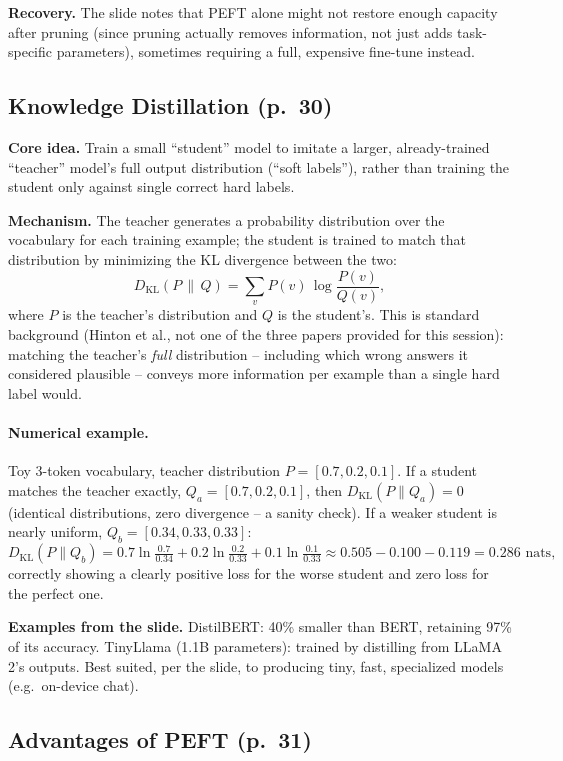 \documentclass[11pt]{article}
\begin{document}
\textbf{Recovery.} The slide notes that PEFT alone might not restore enough capacity after pruning (since pruning actually removes information, not just adds task-specific parameters), sometimes requiring a full, expensive fine-tune instead.

\subsection{Knowledge Distillation (p.\ 30)}

\textbf{Core idea.} Train a small ``student'' model to imitate a larger, already-trained ``teacher'' model's full output distribution (``soft labels''), rather than training the student only against single correct hard labels.

\textbf{Mechanism.} The teacher generates a probability distribution over the vocabulary for each training example; the student is trained to match that distribution by minimizing the KL divergence between the two:
\[
D_{\mathrm{KL}}(P\,\|\,Q) = \sum_{v} P(v)\,\log\frac{P(v)}{Q(v)},
\]
where $P$ is the teacher's distribution and $Q$ is the student's. This is standard background (Hinton et al., not one of the three papers provided for this session): matching the teacher's \emph{full} distribution -- including which wrong answers it considered plausible -- conveys more information per example than a single hard label would.

\paragraph{Numerical example.} Toy 3-token vocabulary, teacher distribution $P=[0.7,0.2,0.1]$. If a student matches the teacher exactly, $Q_a=[0.7,0.2,0.1]$, then $D_{\mathrm{KL}}(P\|Q_a)=0$ (identical distributions, zero divergence -- a sanity check). If a weaker student is nearly uniform, $Q_b=[0.34,0.33,0.33]$:
\[
D_{\mathrm{KL}}(P\|Q_b) = 0.7\ln\tfrac{0.7}{0.34} + 0.2\ln\tfrac{0.2}{0.33} + 0.1\ln\tfrac{0.1}{0.33} \approx 0.505 - 0.100 - 0.119 = 0.286\text{ nats},
\]
correctly showing a clearly positive loss for the worse student and zero loss for the perfect one.

\textbf{Examples from the slide.} DistilBERT: 40\% smaller than BERT, retaining 97\% of its accuracy. TinyLlama (1.1B parameters): trained by distilling from LLaMA 2's outputs. Best suited, per the slide, to producing tiny, fast, specialized models (e.g.\ on-device chat).

\subsection{Advantages of PEFT (p.\ 31)}
\end{document}

